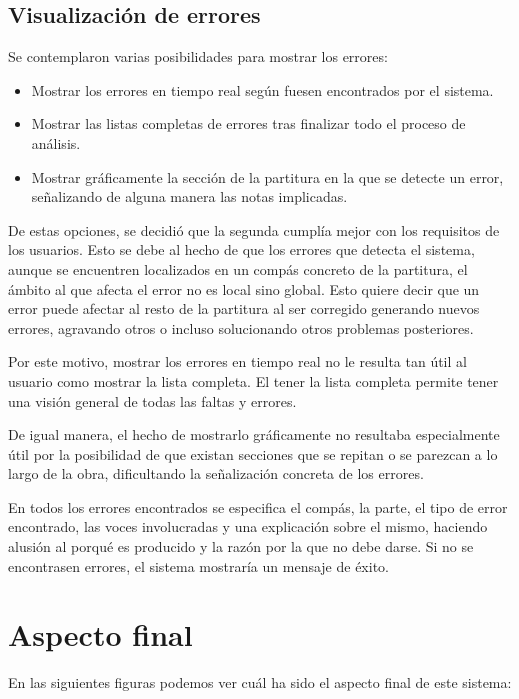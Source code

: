 \subsection{Visualización de errores}

Se contemplaron varias posibilidades para mostrar los errores:

\begin{itemize}
	\item Mostrar los errores en tiempo real según fuesen encontrados por el sistema.
	\item Mostrar las listas completas de errores tras finalizar todo el proceso de análisis.
	\item Mostrar gráficamente la sección de la partitura en la que se detecte un error, señalizando de alguna manera las notas implicadas.
\end{itemize}

\bigskip
\bigskip

De estas opciones, se decidió que la segunda cumplía mejor con los requisitos de los usuarios. Esto se debe al hecho de que los errores que detecta el sistema, aunque se encuentren localizados en un compás concreto de la partitura, el ámbito al que afecta el error no es local sino global. Esto quiere decir que un error puede afectar al resto de la partitura al ser corregido generando nuevos errores, agravando otros o incluso solucionando otros problemas posteriores. 

Por este motivo, mostrar los errores en tiempo real no le resulta tan útil al usuario como mostrar la lista completa. El tener la lista completa permite tener una visión general de todas las faltas y errores. 

De igual manera, el hecho de mostrarlo gráficamente no resultaba especialmente útil por la posibilidad de que existan secciones que se repitan o se parezcan a lo largo de la obra, dificultando la señalización concreta de los errores. 

En todos los errores encontrados se especifica el compás, la parte, el tipo de error encontrado, las voces involucradas y una explicación sobre el mismo, haciendo alusión al porqué es producido y la razón por la que no debe darse. Si no se encontrasen errores, el sistema mostraría un mensaje de éxito.

\section{Aspecto final}

En las siguientes figuras podemos ver cuál ha sido el aspecto final de este sistema:

